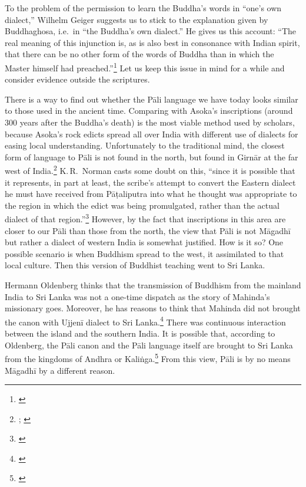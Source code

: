 To the problem of the permission to learn the Buddha's words in ``one's own dialect,'' Wilhelm Geiger suggests us to stick to the explanation given by Buddhaghosa, i.e.\ in ``the Buddha's own dialect.'' He gives us this account: ``The real meaning of this injunction is, as is also best in consonance with Indian spirit, that there can be no other form of the words of Buddha than in which the Master himself had preached.''\footnote{\citealp[p.~7]{geiger:literature}} Let us keep this issue in mind for a while and consider evidence outside the scriptures.

There is a way to find out whether the P\=ali language we have today looks similar to those used in the ancient time. Comparing with Asoka's inscriptions (around 300 years after the Buddha's death) is the most viable method used by scholars, because Asoka's rock edicts spread all over India with different use of dialects for easing local understanding. Unfortunately to the traditional mind, the closest form of language to P\=ali is not found in the north, but found in Girn\=ar at the far west of India.\footnote{\citealp[pp.~182--3]{oberlies:asokan}; \citealp[p.~3]{geiger:literature}} K.\,R.\ Norman casts some doubt on this, ``since it is possible that it represents, in part at least, the scribe's attempt to convert the Eastern dialect he must have received from P\=a\d taliputra into what he thought was appropriate to the region in which the edict was being promulgated, rather than the actual dialect of that region.''\footnote{\citealp[p.~4]{norman:literature}} However, by the fact that inscriptions in this area are closer to our P\=ali than those from the north, the view that P\=ali is not M\=agadh\=i but rather a dialect of western India is somewhat justified. How is it so? One possible scenario is when Buddhism spread to the west, it assimilated to that local culture. Then this version of Buddhist teaching went to Sri Lanka.

Hermann Oldenberg thinks that the transmission of Buddhism from the mainland India to Sri Lanka was not a one-time dispatch as the story of Mahinda's missionary goes. Moreover, he has reasons to think that Mahinda did not brought the canon with Ujjen\=i dialect to Sri Lanka.\footnote{\citealp[pp.~l--li]{oldenberg:vinaya1}} There was continuous interaction between the island and the southern India. It is possible that, according to Oldenberg, the P\=ali canon and the P\=ali language itself are brought to Sri Lanka from the kingdoms of Andhra or Kali\.nga.\footnote{\citealp[p.~liv]{oldenberg:vinaya1}} From this view, P\=ali is by no means M\=agadh\=i by a different reason.

